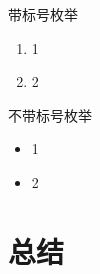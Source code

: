 \documentclass[UTF8,a4paper,10pt]{ctexart}
\newcommand{\xiaosi}{\fontsize{12pt}{18pt}\selectfont}            %
\begin{document}
带标号枚举
\begin{enumerate}
  \item 1
  \item 2
\end{enumerate}

不带标号枚举
\begin{itemize}
  \item 1
  \item 2
\end{itemize}

\xiaosi{切换字体大小}

\section{总结}

\newpage

 
\end{document}
